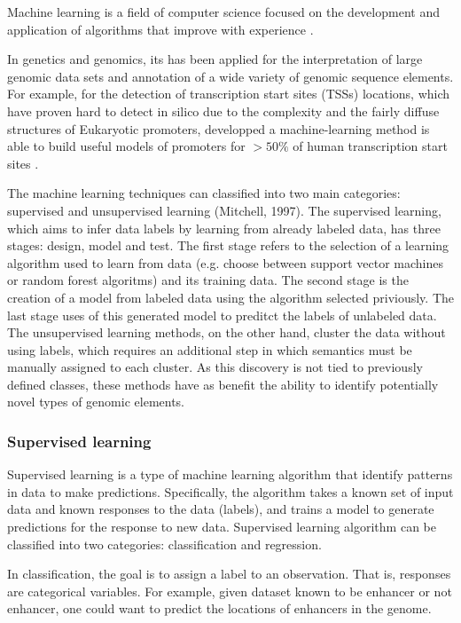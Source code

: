Machine learning is a field of computer science focused on the development and application of algorithms that improve with experience \cite{mitchell1997machine}.

In genetics and genomics, its  has been applied
 for the interpretation of large genomic data sets and annotation of a wide variety of genomic sequence elements.
For example, for the detection of  transcription start sites (TSSs) locations, which have proven hard to detect in silico due to the complexity and the fairly diffuse structures of Eukaryotic promoters,  developped a machine-learning method is able to build useful models of promoters for $>50\%$ of human transcription start sites \cite{down2002computational}.

The machine learning techniques can classified into two main categories: supervised and unsupervised learning (Mitchell, 1997). The supervised learning, which aims to infer data labels by learning from already labeled data, has three stages: design, model and test. The first stage refers to the selection of a learning algorithm used to learn from data (e.g. choose between support vector machines or random forest algoritms) and its training data. The second stage is the creation of a model from labeled data using the algorithm selected priviously.  The last stage uses of this generated model to  preditct the labels of unlabeled data.
The unsupervised learning methods, on the other hand,
cluster the data without using labels, which requires an additional step in which semantics must be manually assigned to each cluster. As this discovery is not tied to previously defined classes, these methods have as benefit the ability to identify potentially novel types of genomic elements.




\subsubsection{Supervised learning}

Supervised learning is a type of machine learning algorithm that identify patterns in data to make predictions.
Specifically, the algorithm takes a known set of input data and known responses to the data (labels), and trains a model to generate predictions for the response to new data.
Supervised learning algorithm can be classified into two  categories: classification and regression.

In classification, the goal is to assign a label to an observation. That is, responses are categorical variables.
For example, given dataset known to be
enhancer or not enhancer, one could want to predict the locations of enhancers in the genome.

